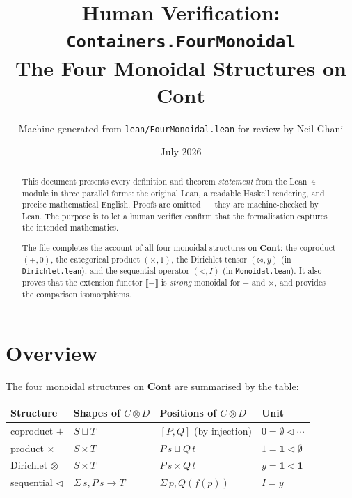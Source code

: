 \documentclass[11pt,a4paper]{article}
\title{Human Verification: \texttt{Containers.FourMonoidal}\\[4pt]
  \large The Four Monoidal Structures on $\mathbf{Cont}$}
\author{Machine-generated from \texttt{lean/FourMonoidal.lean} for review by Neil Ghani}
\date{July 2026}
\begin{document}
\maketitle

\begin{abstract}
This document presents every definition and theorem \emph{statement} from the
Lean~4 module  in three parallel forms: the original
Lean, a readable Haskell rendering, and precise mathematical English.  Proofs
are omitted --- they are machine-checked by Lean.  The purpose is to let a
human verifier confirm that the formalisation captures the intended
mathematics.

The file completes the account of all four monoidal structures on $\mathbf{Cont}$:
the coproduct $(+, 0)$, the categorical product $(\times, 1)$, the Dirichlet
tensor $(\otimes, y)$ (in \texttt{Dirichlet.lean}), and the sequential operator
$(\triangleleft, I)$ (in \texttt{Monoidal.lean}).  It also proves that the
extension functor $\llbracket{-}\rrbracket$ is \emph{strong} monoidal for $+$
and $\times$, and provides the comparison isomorphisms.
\end{abstract}

\tableofcontents
\bigskip

\section{Overview}

The four monoidal structures on $\mathbf{Cont}$ are summarised by the table:

\begin{center}
\begin{tabular}{llll}
\hline
Structure & Shapes of $C \otimes D$ & Positions of $C \otimes D$ & Unit \\
\hline
coproduct $+$ & $S \sqcup T$ & $[P, Q]$ (by injection) & $0 = \emptyset \triangleleft \cdots$ \\
product $\times$ & $S \times T$ & $P\,s \sqcup Q\,t$ & $1 = \mathbf{1} \triangleleft \emptyset$ \\
Dirichlet $\otimes$ & $S \times T$ & $P\,s \times Q\,t$ & $y = \mathbf{1} \triangleleft \mathbf{1}$ \\
sequential $\triangleleft$ & $\Sigma\,s, P\,s \to T$ & $\Sigma\,p, Q(f(p))$ & $I = y$ \\
\hline
\end{tabular}
\end{center}
\end{document}
